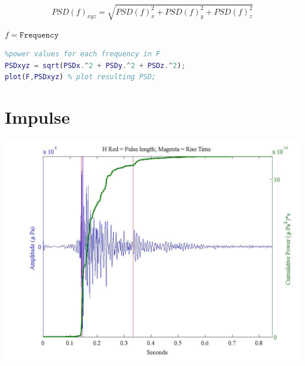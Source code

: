 \documentclass[11pt]{report}
\begin{document}
$$PSD(f)_{xyz} = \sqrt{PSD(f)_x^2 + PSD(f)_y^2 + PSD(f)_z^2}$$

\begin{flushright}
$f = \mathtt{Frequency}$
\end{flushright}

\begin{lstlisting}[style=github, language=MATLAB]
%PSD's are vectors containing the calculated
%power values for each frequency in F
PSDxyz = sqrt(PSDx.^2 + PSDy.^2 + PSDz.^2);
plot(F,PSDxyz) % plot resulting PSD;
\end{lstlisting}

\section{Impulse}

\begin{center}
\includegraphics[width = \textwidth ]{8.jpeg}
\end{center}
\end{document}
